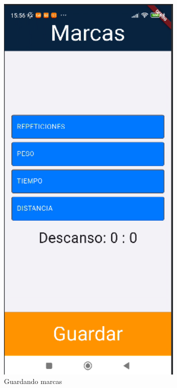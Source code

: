\begin{figure}[H]
   \centering
    \includegraphics[width=0.8\textwidth]{pantallas/guardarMarc.png}
    \caption{Guardando marcas}
    \label{fig:guardarMarc}
\end{figure}

